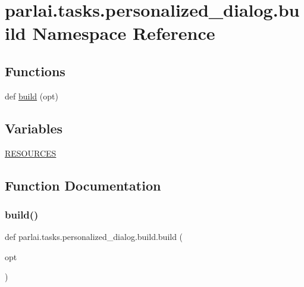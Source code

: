 \hypertarget{namespaceparlai_1_1tasks_1_1personalized__dialog_1_1build}{}\section{parlai.\+tasks.\+personalized\+\_\+dialog.\+build Namespace Reference}
\label{namespaceparlai_1_1tasks_1_1personalized__dialog_1_1build}
\subsection*{Functions}
\begin{DoxyCompactItemize}
\item 
def \hyperlink{namespaceparlai_1_1tasks_1_1personalized__dialog_1_1build_a8e2486f9cfd8af50e1da077ea5ed7c5e}{build} (opt)
\end{DoxyCompactItemize}
\subsection*{Variables}
\begin{DoxyCompactItemize}
\item 
\hyperlink{namespaceparlai_1_1tasks_1_1personalized__dialog_1_1build_ae47eba405e350fc035778ff781c48252}{R\+E\+S\+O\+U\+R\+C\+ES}
\end{DoxyCompactItemize}


\subsection{Function Documentation}
\mbox{\label{namespaceparlai_1_1tasks_1_1personalized__dialog_1_1build_a8e2486f9cfd8af50e1da077ea5ed7c5e}} 
\subsubsection{\texorpdfstring{build()}{build()}}
{\footnotesize\ttfamily def parlai.\+tasks.\+personalized\+\_\+dialog.\+build.\+build (\begin{DoxyParamCaption}\item[{}]{opt }\end{DoxyParamCaption})}



